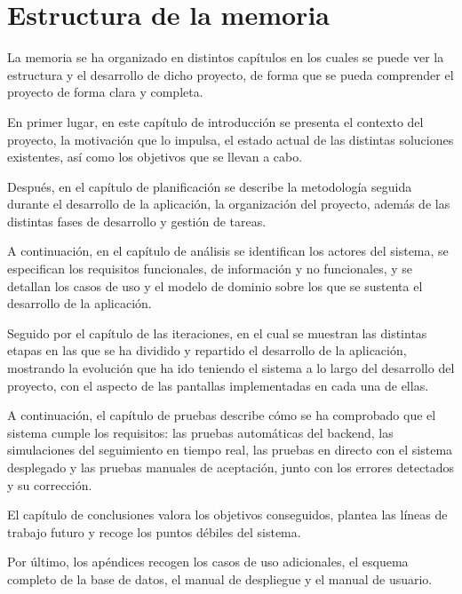 \section{Estructura de la memoria}\label{cap:estructura_memoria}

La memoria se ha organizado en distintos capítulos en los cuales se puede ver la estructura y el desarrollo de dicho proyecto, de forma que se pueda comprender el proyecto de forma clara y completa.

En primer lugar, en este capítulo de introducción se presenta el contexto del proyecto, la motivación que lo impulsa, el estado actual de las distintas soluciones existentes, así como los objetivos que se llevan a cabo.

Después, en el capítulo de planificación se describe la metodología seguida durante el desarrollo de la aplicación, la organización del proyecto, además de las distintas fases de desarrollo y gestión de tareas.

A continuación, en el capítulo de análisis se identifican los actores del sistema, se especifican los requisitos funcionales, de información y no funcionales, y se detallan los casos de uso y el modelo de dominio sobre los que se sustenta el desarrollo de la aplicación.

Seguido por el capítulo de las iteraciones, en el cual se muestran las distintas etapas en las que se ha dividido y repartido el desarrollo de la aplicación, mostrando la evolución que ha ido teniendo el sistema a lo largo del desarrollo del proyecto, con el aspecto de las pantallas implementadas en cada una de ellas.

A continuación, el capítulo de pruebas describe cómo se ha comprobado que el sistema cumple los requisitos: las pruebas automáticas del backend, las simulaciones del seguimiento en tiempo real, las pruebas en directo con el sistema desplegado y las pruebas manuales de aceptación, junto con los errores detectados y su corrección.

El capítulo de conclusiones valora los objetivos conseguidos, plantea las líneas de trabajo futuro y recoge los puntos débiles del sistema.

Por último, los apéndices recogen los casos de uso adicionales, el esquema completo de la base de datos, el manual de despliegue y el manual de usuario.